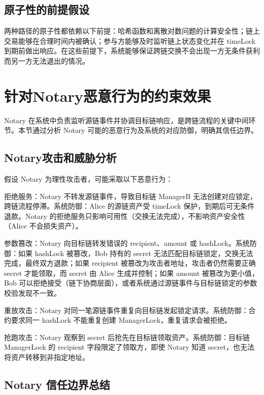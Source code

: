 \subsection{原子性的前提假设}


两种路径的原子性都依赖以下前提：哈希函数和离散对数问题的计算安全性；链上交易能够在合理时间内被确认；参与方能够及时监听链上状态变化并在 timeLock 到期前做出响应。在这些前提下，系统能够保证跨链交换不会出现一方无条件获利而另一方无法退出的情况。


\section{针对Notary恶意行为的约束效果}


Notary 在系统中负责监听源链事件并协调目标链响应，是跨链流程的关键中间环节。本节通过分析 Notary 可能的恶意行为及系统的对应防御，明确其信任边界。


\subsection{Notary攻击和威胁分析}


假设 Notary 为理性攻击者，可能采取以下恶意行为：


拒绝服务：Notary 不转发源链事件，导致目标链 ManagerB 无法创建对应锁定，跨链流程停滞。系统防御：Alice 的源链资产受 timeLock 保护，到期后可无条件退款。Notary 的拒绝服务只影响可用性（交换无法完成），不影响资产安全性（Alice 不会损失资产）。


参数篡改：Notary 向目标链转发错误的 recipient、amount 或 hashLock。系统防御：如果 hashLock 被篡改，Bob 持有的 secret 无法匹配目标链锁定，交换无法完成，最终双方退款；如果 recipient 被篡改为攻击者地址，攻击者仍然需要正确 secret 才能领取，而 secret 由 Alice 生成并控制；如果 amount 被篡改为更小值，Bob 可以拒绝接受（链下协商层面），或者系统通过源链事件与目标链锁定的参数校验发现不一致。


重放攻击：Notary 对同一笔源链事件重复向目标链发起锁定请求。系统防御：合约要求同一 hashLock 不能重复创建 ManagerLock，重复请求会被拒绝。


抢跑攻击：Notary 观察到 secret 后抢先在目标链领取资产。系统防御：目标链 ManagerLock 的 recipient 字段限定了领取方，即使 Notary 知道 secret，也无法将资产转移到非指定地址。


\subsection{Notary 信任边界总结}


